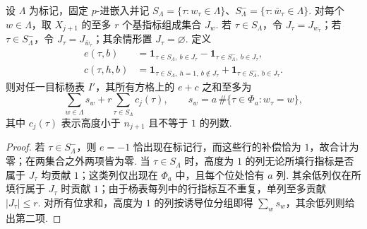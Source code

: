 \begin{lemma}[标记邻点上的方格计数]
\label{lem:a-marked-neighbor-box-count}
\emitthmsource
设 $\Lambda$ 为标记，固定 $p$-进嵌入并记 $S_\Lambda=\{\tau:w_\tau\in\Lambda\}$、$S_\Lambda^-=\{\tau:\bar w_\tau\in\Lambda\}$. 对每个 $w\in\Lambda$，取 $X_{j+1}$ 的至多 $r$ 个基指标组成集合 $J_w$. 若 $\tau\in S_\Lambda$，令 $J_\tau=J_{w_\tau}$；若 $\tau\in S_\Lambda^-$，令 $J_\tau=J_{\bar w_\tau}$；其余情形置 $J_\tau=\varnothing$. 定义
\[
 \begin{aligned}
 e(\tau,b)&=\mathbf 1_{\tau\in S_\Lambda,\ b\in J_\tau}
              -\mathbf 1_{\tau\in S_\Lambda^-,\ b\in J_\tau},\\
 c(\tau,h,b)&=\mathbf 1_{\tau\in S_\Lambda,\ h=1,\ b\notin J_\tau}
              +\mathbf 1_{\tau\in S_\Lambda^-,\ b\in J_\tau}.
 \end{aligned}
\]
则对任一目标杨表 $I'$，其所有方格上的 $e+c$ 之和至多为
\[
 \sum_{w\in\Lambda}s_w+r\sum_{\tau\in S_\Lambda}c_j(\tau),
 \qquad s_w=a\,\#\{\tau\in\Phi_a:w_\tau=w\},
\]
其中 $c_j(\tau)$ 表示高度小于 $n_{j+1}$ 且不等于 $1$ 的列数.
\end{lemma}
\begin{proof}
若 $\tau\in S_\Lambda^-$，则 $e=-1$ 恰出现在标记行，而这些行的补偿恰为 $1$，故合计为零；在两集合之外两项皆为零. 当 $\tau\in S_\Lambda$ 时，高度为 $1$ 的列无论所填行指标是否属于 $J_\tau$ 均贡献 $1$；这类列仅出现在 $\Phi_a$ 中，且每个位处恰有 $a$ 列. 其余低列仅在所填行属于 $J_\tau$ 时贡献 $1$；由于杨表每列中的行指标互不重复，单列至多贡献 $|J_\tau|\le r$. 对所有位求和，高度为 $1$ 的列按诱导位分组即得 $\sum_w s_w$，其余低列则给出第二项.
\end{proof}

